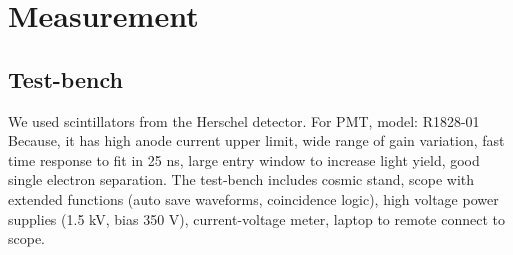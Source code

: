 \section{Measurement}
\label{sec:Measurement}


\subsection{Test-bench}
We used scintillators from the Herschel detector.\cite{Gligorov:2017nwh}
For PMT, model: R1828-01
Because, it has high anode current upper limit, wide range of gain variation, fast time response to fit in 25 ns, large entry window to increase light yield, good single electron separation.
The test-bench includes cosmic stand, scope with extended functions (auto save waveforms, coincidence logic), high voltage power supplies (1.5 kV, bias 350 V), current-voltage meter, laptop to remote connect to scope.

